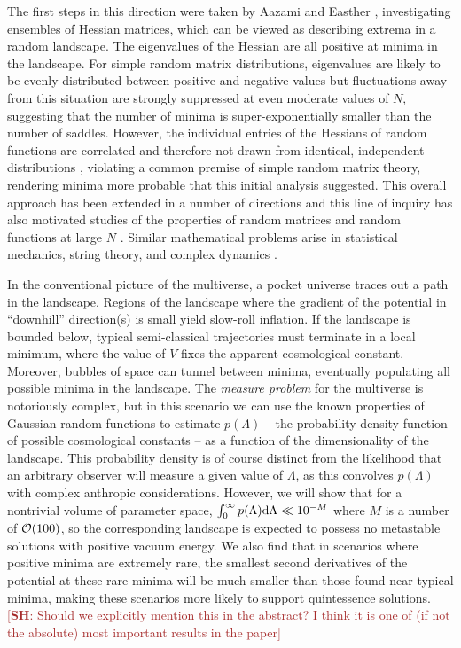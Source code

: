 \documentclass[12pt]{article}
\newcommand{\SH}[1]{\textcolor{brown}{[{\bf SH}: #1]}}
\begin{document}
The first steps in this direction were taken by Aazami and Easther \cite{Aazami2006}, investigating ensembles of Hessian matrices, which can be viewed as describing extrema in a random landscape. The eigenvalues of the Hessian are all positive at minima in the landscape. For simple random matrix distributions, eigenvalues are likely to be evenly distributed between positive and negative values but fluctuations away from this situation are strongly suppressed at even moderate values of $N$, suggesting that the number of minima is super-exponentially smaller than the number of saddles. However, the individual entries of the Hessians of random functions are correlated and therefore not drawn from identical, independent distributions \cite{Battefeld2012,Easther2016}, violating a common premise of simple random matrix theory, rendering minima more probable that this initial analysis suggested.  This overall approach has been  extended in a number of directions \cite{Easther2006, Frazer2011, Henry2009, Marsh2013, Agarwal2011,Yang2012,Masoumi2016,Yamada2018} and this line of inquiry has also motivated studies of the properties of random matrices and random functions at large $N$ \cite{Bray2007,Dean2008,Majumdar2009,Bachlechner2014,Battefeld2012,Fyodorov2013,Masoumi2017}. Similar mathematical problems arise in statistical mechanics, string theory, and complex dynamics \cite{Fyodorov2004,Douglas2004,Douglas2006,Fyodorov2007,Fyodorov2012,Fyodorov2018,Ros2019}.

 
In the conventional picture of the multiverse, a pocket universe traces out a path in the landscape. Regions of the landscape where the gradient of the potential in ``downhill'' direction(s) is small yield slow-roll inflation. If the landscape is bounded below, typical semi-classical trajectories must terminate in a local minimum, where the value of $V$ fixes the apparent cosmological constant. Moreover, bubbles of space can tunnel between minima, eventually populating all possible minima in the landscape.  The {\em measure problem\/} for the multiverse is notoriously complex, but in this scenario we can use the known properties of Gaussian random functions to estimate $p(\Lambda)$ -- the probability density function of possible cosmological constants -- as a function of the dimensionality of the landscape.  This probability density is of course distinct from the likelihood that an arbitrary observer will measure a given value of $\Lambda$, as this convolves $p(\Lambda)$ with complex anthropic considerations. However, we will show that for a nontrivial volume of parameter space,  $\int_0^\infty  p(\Lambda) {\rm d}\Lambda \ll 10^{-M}$  where $M$ is a number of ${\cal{O}}(100)$, so the corresponding landscape is expected to possess no metastable solutions with  positive vacuum energy. We also find that in scenarios where positive minima are extremely rare, the smallest second derivatives of the potential at these rare minima will be much smaller than those found near typical minima, making these scenarios more likely to support quintessence solutions.\SH{Should we explicitly mention this in the abstract? I think it is one of (if not the absolute) most important results in the paper}
\end{document}
